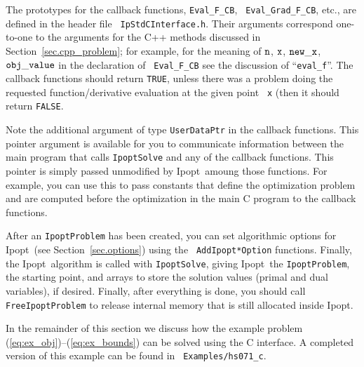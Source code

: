 \documentclass[letter,10pt]{article}
\newcommand{\Ipopt}{{\sc Ipopt}}
\begin{document}
The prototypes for the callback functions, {\tt Eval\_F\_CB}, {\tt
  Eval\_Grad\_F\_CB}, etc., are defined in the header file {\tt
  IpStdCInterface.h}.  Their arguments correspond one-to-one to the
arguments for the C++ methods discussed in
Section~\ref{sec.cpp_problem}; for example, for the meaning of $\tt
n$, $\tt x$, $\tt new\_x$, $\tt obj\_value$ in the declaration of {\tt
  Eval\_F\_CB} see the discussion of ``{\tt eval\_f}''.  The callback
functions should return {\tt TRUE}, unless there was a problem doing
the requested function/derivative evaluation at the given point {\tt
  x} (then it should return {\tt FALSE}.

Note the additional argument of type {\tt UserDataPtr} in the callback
functions.  This pointer argument is available for you to communicate
information between the main program that calls {\tt IpoptSolve} and
any of the callback functions.  This pointer is simply passed
unmodified by \Ipopt\ amoung those functions.  For example, you can
use this to pass constants that define the optimization problem and
are computed before the optimization in the main C program to the
callback functions.

After an {\tt IpoptProblem} has been created, you can set algorithmic
options for \Ipopt\ (see Section~\ref{sec.options}) using the {\tt
  AddIpopt*Option} functions.  Finally, the \Ipopt\ algorithm is
called with {\tt IpoptSolve}, giving \Ipopt\ the {\tt IpoptProblem},
the starting point, and arrays to store the solution values (primal
and dual variables), if desired.  Finally, after everything is done,
you should call {\tt FreeIpoptProblem} to release internal memory that
is still allocated inside \Ipopt.

In the remainder of this section we discuss how the example problem
(\ref{eq:ex_obj})--(\ref{eq:ex_bounds}) can be solved using the C
interface.  A completed version of this example can be found in {\tt
  Examples/hs071\_c}.

\end{document}
